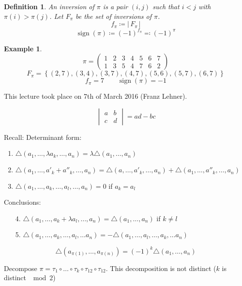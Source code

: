 \documentclass[a4paper,landscape,twocolumn]{article}
\newcommand\meta[3]{This #1 took place on #2 (#3).\par}
\newcommand\set[1]{\left\{#1\right\}}
\newcommand\card[1]{\left|\,#1\,\right|}
\newtheorem{defi}{Definition}
\newtheorem{ex}{Example}
\begin{document}
\begin{defi}
  \label{def-7.14}
  An \emph{inversion} of $\pi$ is a pair $(i,j)$ such that
  $i < j$ with $\pi(i) > \pi(j)$.
  Let $F_\pi$ be the set of inversions of $\pi$.
  \[ f_{\pi} \coloneqq \card{F_\pi} \]
  \[ \operatorname{sign}(\pi) \coloneqq (-1)^{f_\pi} \eqqcolon (-1)^\pi \]
\end{defi}

\begin{ex}
  \label{example-7.15}
  \[
    \pi = \begin{pmatrix}
      1 & 2 & 3 & 4 & 5 & 6 & 7 \\
      1 & 3 & 5 & 4 & 7 & 6 & 2
    \end{pmatrix}
  \] \[
    F_\pi = \set{(2,7), (3,4), (3,7), (4,7), (5,6), (5,7), (6,7)}
  \]
  \[ f_\pi = 7 \qquad \operatorname{sign}(\pi) = -1 \]
\end{ex}

\meta{lecture}{7th of March 2016}{Franz Lehner}

\[
  \begin{vmatrix}
    a & b \\
    c & d
  \end{vmatrix}
  = ad - bc
\]

Recall: Determinant form:
\begin{enumerate}
  \item $\triangle(a_1, \ldots, \lambda a_k, \ldots, a_n) = \lambda \triangle (a_1, \ldots, a_n)$
  \item $\triangle(a_1, \ldots, a'_k + a''_k, \ldots, a_n) = \triangle(a, \ldots, a'_k, \ldots, a_n) + \triangle(a_1, \ldots, a''_k, \ldots, a_n)$
  \item $\triangle(a_1, \ldots, a_k, \ldots, a_l, \ldots, a_n) = 0$ if $a_k = a_l$
\end{enumerate}
Conclusions:
\begin{enumerate}
  \item[4.] $\triangle (a_1, \ldots, a_k + \lambda a_l, \ldots, a_n) = \triangle (a_1, \ldots, a_n)$ if $k \neq l$
  \item[5.] $\triangle (a_1, \ldots, a_k, \ldots, a_l, \ldots a_n) = -\triangle (a_1, \ldots, a_l, \ldots, a_k, \ldots a_n)$
\end{enumerate}

\[ \triangle (a_{\pi(1)}, \ldots, a_{\pi(n)}) = (-1)^k \triangle (a_1, \ldots, a_n) \]

Decompose $\pi = \tau_1 \circ \ldots \circ \tau_k \circ \tau_{12} \circ \tau_{12}$.
This decomposition is not distinct ($k$ is distinct $\mod 2$)
\end{document}
